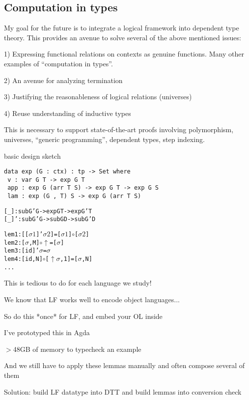 \documentclass{article}
\begin{document}
\subsection{Computation in types}
My goal for the future is to integrate a logical framework into
dependent type theory. This provides an avenue to solve several of the
above mentioned issues:


1) Expressing functional relations on contexts as genuine
functions. Many other examples of ``computation in types''.

2) An avenue for analyzing termination

3) Justifying the reasonableness of logical relations (universes)

4) Reuse understanding of inductive types

This is necessary to support state-of-the-art proofs involving polymorphism,
universes, ``generic programming'', dependent types, step indexing.

basic design sketch

\begin{verbatim}
data exp (G : ctx) : tp -> Set where
 v : var G T -> exp G T
 app : exp G (arr T S) -> exp G T -> exp G S
 lam : exp (G , T) S -> exp G (arr T S)
\end{verbatim}

\begin{alltt}
[_] : sub G' G -> exp G T -> exp G' T
[_]' : sub G' G -> sub G D -> sub G' D
\end{alltt}

\begin{alltt}
lem1 : [ [ \(\sigma1\) ]' \(\sigma2\) ] = [ \(\sigma1\) ] \(\circ\) [ \(\sigma2\) ]
lem2 : [ \(\sigma\) , M ] \(\circ\) \(\uparrow\) = [ \(\sigma\) ]
lem3 : [ id ]' \(\sigma\) = \(\sigma\)
lem4 : [ id , N ] \(\circ\) [ \(\uparrow\) \(\sigma\), 1 ] = [ \(\sigma\) , N ]
...
\end{alltt}
This is tedious to do for each language we study!

We know that LF works well to encode object languages...

So do this *once* for LF, and embed your OL inside

I've prototyped this in Agda

$>$48GB of memory to typecheck an example

And we still have to apply these lemmas manually and often compose several of them

Solution: build LF datatype into DTT and build lemmas into conversion check
\end{document}
